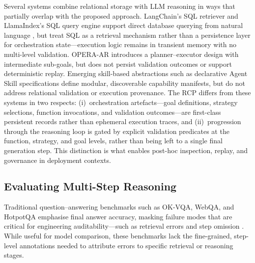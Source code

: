 \documentclass[largeformat]{interact}
\begin{document}
Several systems combine relational storage with LLM reasoning in ways that partially overlap with the proposed approach. LangChain's SQL retriever and LlamaIndex's SQL query engine support direct database querying from natural language \cite{aster2024langchainsql}, but treat SQL as a retrieval mechanism rather than a persistence layer for orchestration state---execution logic remains in transient memory with no multi-level validation. OPERA-AR \cite{Liu2025OPERAAR} introduces a planner--executor design with intermediate sub-goals, but does not persist validation outcomes or support deterministic replay. Emerging skill-based abstractions such as declarative Agent Skill specifications \cite{agentskills2024} define modular, discoverable capability manifests, but do not address relational validation or execution provenance. The RCP differs from these systems in two respects: (i)~orchestration artefacts---goal definitions, strategy selections, function invocations, and validation outcomes---are first-class persistent records rather than ephemeral execution traces, and (ii)~progression through the reasoning loop is gated by explicit validation predicates at the function, strategy, and goal levels, rather than being left to a single final generation step. This distinction is what enables post-hoc inspection, replay, and governance in deployment contexts.

\subsection{Evaluating Multi-Step Reasoning}
\label{sec:evaluating_multistep_reasoning}
Traditional question--answering benchmarks such as OK-VQA, WebQA, and HotpotQA emphasise final answer accuracy, masking failure modes that are critical for engineering auditability---such as retrieval errors and step omission \cite{marino2019okvqa, chang2021webqa, yang2018hotpotqa}. While useful for model comparison, these benchmarks lack the fine-grained, step-level annotations needed to attribute errors to specific retrieval or reasoning stages.
\end{document}
